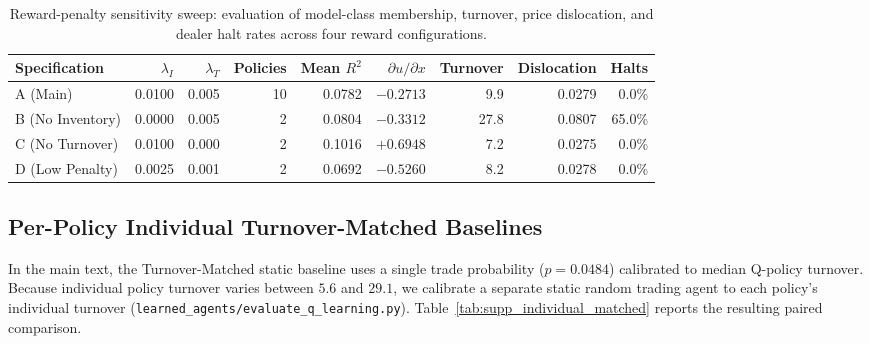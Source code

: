 \documentclass[11pt,a4paper]{article}
\theoremstyle{definition}\newtheorem{definition}[theorem]{Definition}
\theoremstyle{remark}\newtheorem{remark}[theorem]{Remark}
\begin{document}
\begin{table}[htbp]
\centering\small\setlength{\tabcolsep}{4pt}
\caption{Reward-penalty sensitivity sweep: evaluation of model-class membership, turnover, price dislocation, and dealer halt rates across four reward configurations.}
\label{tab:supp_reward_sensitivity}
\begin{tabular}{lrrrrrrrr}
\toprule
Specification & $\lambda_I$ & $\lambda_T$ & Policies & Mean $R^2$ & $\partial u/\partial x$ & Turnover & Dislocation & Halts \\
\midrule
A (Main) & 0.0100 & 0.005 & 10 & 0.0782 & $-0.2713$ & 9.9 & 0.0279 & 0.0\% \\
B (No Inventory) & 0.0000 & 0.005 & 2 & 0.0804 & $-0.3312$ & 27.8 & 0.0807 & 65.0\% \\
C (No Turnover) & 0.0100 & 0.000 & 2 & 0.1016 & $+0.6948$ & 7.2 & 0.0275 & 0.0\% \\
D (Low Penalty) & 0.0025 & 0.001 & 2 & 0.0692 & $-0.5260$ & 8.2 & 0.0278 & 0.0\% \\
\bottomrule
\end{tabular}
\end{table}

\subsection{Per-Policy Individual Turnover-Matched Baselines}
\label{sec:supp_individual_matched}
In the main text, the Turnover-Matched static baseline uses a single trade probability ($p = 0.0484$) calibrated to median Q-policy turnover. Because individual policy turnover varies between $5.6$ and $29.1$, we calibrate a separate static random trading agent to each policy's individual turnover (\nolinkurl{learned_agents/evaluate_q_learning.py}). Table~\ref{tab:supp_individual_matched} reports the resulting paired comparison.
\end{document}
